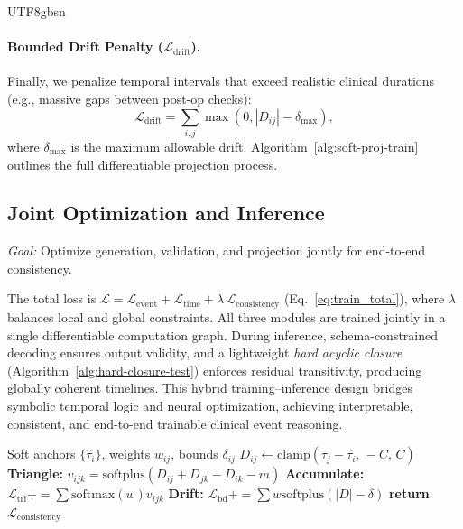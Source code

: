 \documentclass[11pt]{article}
\begin{document}
\begin{CJK*}{UTF8}{gbsn}
\paragraph{Bounded Drift Penalty ($\mathcal{L}_{\text{drift}}$).}
Finally, we penalize temporal intervals that exceed realistic clinical durations (e.g., massive gaps between post-op checks):
\begin{equation}
\mathcal{L}_{\text{drift}} = \sum_{i,j} \max(0, |D_{ij}| - \delta_{\text{max}}),
\end{equation}
where $\delta_{\text{max}}$ is the maximum allowable drift. Algorithm~\ref{alg:soft-proj-train} outlines the full differentiable projection process.

\subsection{Joint Optimization and Inference}
\textit{Goal:} Optimize generation, validation, and projection jointly for end-to-end consistency.

The total loss is $\mathcal{L} = \mathcal{L}_{\text{event}} + \mathcal{L}_{\text{time}} + \lambda\,\mathcal{L}_{\text{consistency}}$ (Eq.~\ref{eq:train_total}), where $\lambda$ balances local and global constraints. All three modules are trained jointly in a single differentiable computation graph. During inference, schema-constrained decoding ensures output validity, and a lightweight \emph{hard acyclic closure} (Algorithm~\ref{alg:hard-closure-test}) enforces residual transitivity, producing globally coherent timelines. This hybrid training–inference design bridges symbolic temporal logic and neural optimization, achieving interpretable, consistent, and end-to-end trainable clinical event reasoning.

\begin{algorithm}[t]
\small
\caption{Soft Transitive Projection for Training}
\label{alg:soft-proj-train}
\begin{algorithmic}[1]
\REQUIRE Soft anchors $\{\hat{\tau}_i\}$, weights $w_{ij}$, bounds $\delta_{ij}$
\STATE $D_{ij} \leftarrow \mathrm{clamp}(\hat{\tau}_j - \hat{\tau}_i,\,-C,\,C)$
  \STATE \textbf{Triangle:} $v_{ijk} = \mathrm{softplus}(D_{ij} + D_{jk} - D_{ik} - m)$
  \STATE \textbf{Accumulate:} $\mathcal{L}_{\text{tri}} += \sum \text{softmax}(w) v_{ijk}$
  \STATE \textbf{Drift:} $\mathcal{L}_{\text{bd}} += \sum w \text{softplus}(|D|-\delta)$
\ENDFOR
\STATE \textbf{return} $\mathcal{L}_{\text{consistency}}$
\end{algorithmic}
\end{algorithm}


\end{CJK*}
\end{document}
